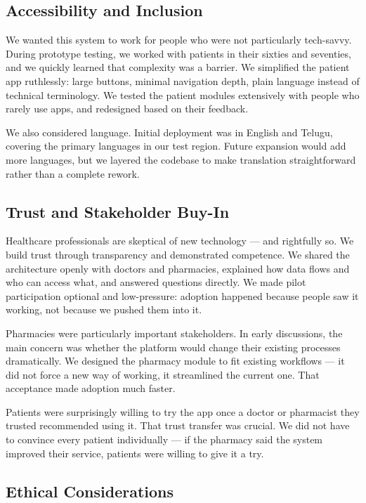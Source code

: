 \documentclass[12pt,a4paper]{report}
\begin{document}
\begin{itemize}
\subsection{Accessibility and Inclusion}

We wanted this system to work for people who were not particularly tech-savvy. During prototype testing, we worked with patients in their sixties and seventies, and we quickly learned that complexity was a barrier. We simplified the patient app ruthlessly: large buttons, minimal navigation depth, plain language instead of technical terminology. We tested the patient modules extensively with people who rarely use apps, and redesigned based on their feedback.

We also considered language. Initial deployment was in English and Telugu, covering the primary languages in our test region. Future expansion would add more languages, but we layered the codebase to make translation straightforward rather than a complete rework.

\subsection{Trust and Stakeholder Buy-In}

Healthcare professionals are skeptical of new technology — and rightfully so. We build trust through transparency and demonstrated competence. We shared the architecture openly with doctors and pharmacies, explained how data flows and who can access what, and answered questions directly. We made pilot participation optional and low-pressure: adoption happened because people saw it working, not because we pushed them into it.

Pharmacies were particularly important stakeholders. In early discussions, the main concern was whether the platform would change their existing processes dramatically. We designed the pharmacy module to fit existing workflows — it did not force a new way of working, it streamlined the current one. That acceptance made adoption much faster.

Patients were surprisingly willing to try the app once a doctor or pharmacist they trusted recommended using it. That trust transfer was crucial. We did not have to convince every patient individually — if the pharmacy said the system improved their service, patients were willing to give it a try.

\subsection{Ethical Considerations}


\end{itemize}
\end{document}
